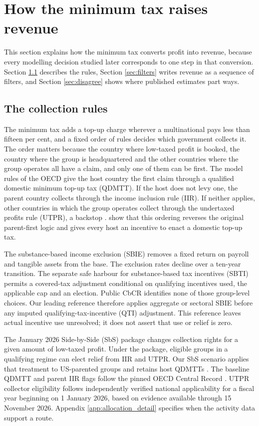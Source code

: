 \documentclass[11pt,a4paper]{article}
\begin{document}
\section{How the minimum tax raises revenue}\label{sec:institutions}

This section explains how the minimum tax converts profit into revenue, because every modelling decision studied later corresponds to one step in that conversion. Section \ref{sec:rules} describes the rules, Section \ref{sec:filters} writes revenue as a sequence of filters, and Section \ref{sec:disagree} shows where published estimates part ways.

\subsection{The collection rules}\label{sec:rules}

The minimum tax adds a top-up charge wherever a multinational pays less than fifteen per cent, and a fixed order of rules decides which government collects it. The order matters because the country where low-taxed profit is booked, the country where the group is headquartered and the other countries where the group operates all have a claim, and only one of them can be first. The model rules of the OECD give the host country the first claim through a qualified domestic minimum top-up tax (QDMTT). If the host does not levy one, the parent country collects through the income inclusion rule (IIR). If neither applies, other countries in which the group operates collect through the undertaxed profits rule (UTPR), a backstop \citep{oecd2025}. \citet{devereux2022} show that this ordering reverses the original parent-first logic and gives every host an incentive to enact a domestic top-up tax.

The substance-based income exclusion (SBIE) removes a fixed return on payroll and tangible assets from the base. The exclusion rates decline over a ten-year transition. The separate safe harbour for substance-based tax incentives (SBTI) permits a covered-tax adjustment conditional on qualifying incentives used, the applicable cap and an election. Public CbCR identifies none of those group-level choices. Our leading reference therefore applies aggregate or sectoral SBIE before any imputed qualifying-tax-incentive (QTI) adjustment. This reference leaves actual incentive use unresolved; it does not assert that use or relief is zero.

The January 2026 Side-by-Side (SbS) package changes collection rights for a given amount of low-taxed profit. Under the package, eligible groups in a qualifying regime can elect relief from IIR and UTPR. Our SbS scenario applies that treatment to US-parented groups and retains host QDMTTs \citep{oecd2026}. The baseline QDMTT and parent IIR flags follow the pinned OECD Central Record \citep{oecdCentralRecord2026}. UTPR collector eligibility follows independently verified national applicability for a fiscal year beginning on 1 January 2026, based on evidence available through 15 November 2026. Appendix \ref{app:allocation_detail} specifies when the activity data support a route.
\end{document}
